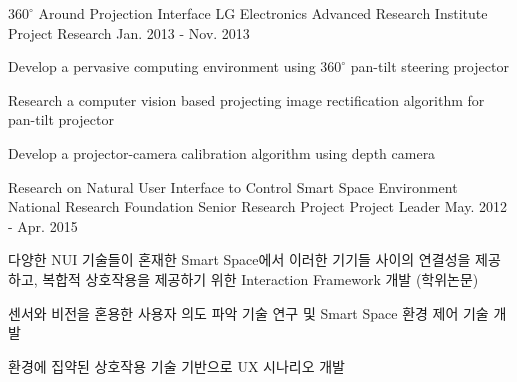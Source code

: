 \begin{cventries}
  \cventry
    {$360^{\circ}$ Around Projection Interface} %
    {LG Electronics Advanced Research Institute Project} %
    {Research} %
    {Jan. 2013 - Nov. 2013} %
    {
      \begin{cvitems} %
        \item {Develop a pervasive computing environment using $360^{\circ}$ pan-tilt steering projector}
        \item {Research a computer vision based projecting image rectification algorithm for pan-tilt projector}
        \item {Develop a projector-camera calibration algorithm using depth camera}
      \end{cvitems} 
    }

  \cventry
    {Research on Natural User Interface to Control Smart Space Environment} %
    {National Research Foundation Senior Research Project} %
    {Project Leader} %
    {May. 2012 - Apr. 2015} %
    {
      \begin{cvitems} %
        \item {다양한 NUI 기술들이 혼재한 Smart Space에서 이러한 기기들 사이의 연결성을 제공하고, 복합적 상호작용을 제공하기 위한 Interaction Framework 개발 (학위논문)}
        \item {센서와 비전을 혼용한 사용자 의도 파악 기술 연구 및 Smart Space 환경 제어 기술 개발}
        \item {환경에 집약된 상호작용 기술 기반으로 UX 시나리오 개발}
      \end{cvitems}
    }


\end{cventries}

